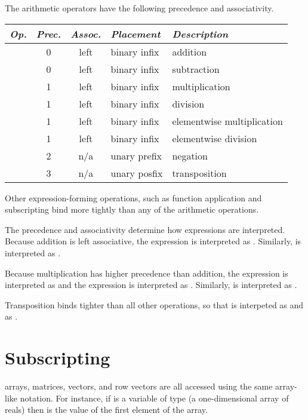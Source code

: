 The arithmetic operators have the following precedence and
associativity.
%
\begin{center}
\begin{tabular}{c|ccl|l}
{\it Op.} & {\it Prec.} & {\it Assoc.} & {\it
  Placement} & {\it Description}
\\ \hline \hline
\code{+} & 0 & left & binary infix & addition
\\
\code{-} & 0 & left & binary infix & subtraction
\\ \hline
\code{*} & 1 & left & binary infix & multiplication
\\
\code{/} & 1 & left & binary infix & division
\\ \hline
\code{.*} & 1 & left & binary infix & elementwise multiplication
\\
\code{./} & 1 & left & binary infix & elementwise division
\\ \hline
\code{-} & 2 & n/a & unary prefix & negation
\\ \hline
\code{'} & 3 & n/a & unary posfix & transposition
\end{tabular}
\end{center}
%
Other expression-forming operations, such as function application and
subscripting bind more tightly than any of the arithmetic operations.  

The precedence and associativity determine how expressions are
interpreted.  Because addition is left associative, the expression
 is interpreted as .  Similarly,
 is interpreted as .  

Because multiplication has higher precedence than addition, the
expression  is interpreted as  and the
expression  is interpreted as .  Similarly,
 is interpreted as .

Transposition binds tighter than all other operations, so that
 is interpeted as  and  as
.

\section{Subscripting}

\Stan arrays, matrices, vectors, and row vectors are all accessed
using the same array-like notation.  For instance, if  is a
variable of type  (a one-dimensional array of reals)
then  is the value of the first element of the
array.  

